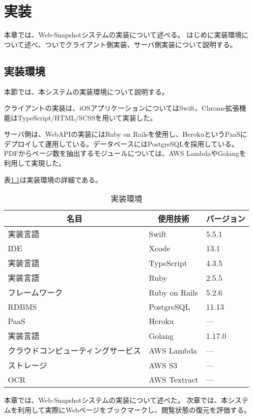 \chapter{実装}
\label{chap:implementation}
本章では、Web-Snapshotシステムの実装について述べる。
はじめに実装環境について述べ、ついでクライアント側実装、サーバ側実装について説明する。

\section{実装環境}
本節では、本システムの実装環境について説明する。

クライアントの実装は、iOSアプリケーションについてはSwift、Chrome拡張機能はTypeScript/HTML/SCSSを用いて実装した。

サーバ側は、WebAPIの実装にはRuby on Railsを使用し、Heroku\cite{heroku}というPaaSにデプロイして運用している。データベースにはPostgreSQLを採用している。
PDFからページ数を抽出するモジュールについては、AWS Lambda\cite{lambda}やGolangを利用して実現した。

表\ref{tb:implementation-env}は実装環境の詳細である。

\begin{table}[htbp]
  \label{tb:implementation-env}
  \caption{実装環境}
  \begin{center}
    \begin{tabular}{|l|l|l|}
    \hline
    \multicolumn{1}{|c|}{\textbf{名目}} & \multicolumn{1}{|c|}{\textbf{使用技術}} & \multicolumn{1}{|c|}{\textbf{バージョン}} \\ \hline
    実装言語 & Swift & 5.5.1 \\ \hline
    IDE & Xcode & 13.1 \\ \hline
    実装言語 & TypeScript & 4.3.5 \\ \hline
    実装言語 & Ruby & 2.5.5 \\ \hline
    フレームワーク & Ruby on Rails & 5.2.6 \\ \hline
    RDBMS & PostgreSQL & 11.13 \\ \hline
    PaaS & Heroku & --- \\ \hline
    実装言語 & Golang & 1.17.0 \\ \hline
    クラウドコンピューティングサービス & AWS Lambda & --- \\ \hline
    ストレージ & AWS S3 & --- \\ \hline
    OCR & AWS Textract\cite{textract} & --- \\ \hline
    \end{tabular}
  \end{center}
\end{table}





本章では、Web-Snapshotシステムの実装について述べた。
次章では、本システムを利用して実際にWebページをブックマークし、閲覧状態の復元を評価する。